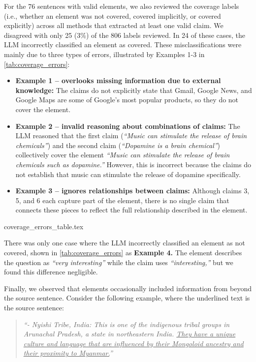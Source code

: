 For the 76 sentences with valid elements, we also reviewed the coverage labels (i.e., whether an element was not covered, covered implicitly, or covered explicitly) across all methods that extracted at least one valid claim. We disagreed with only 25 (3\%) of the 806 labels reviewed. In 24 of these cases, the LLM incorrectly classified an element as covered. These misclassifications were mainly due to three types of errors, illustrated by Examples 1-3 in \autoref{tab:coverage_errors}:
\begin{itemize}
    \item \textbf{Example 1 – overlooks missing information due to external knowledge:} The claims do not explicitly state that Gmail, Google News, and Google Maps are some of Google’s most popular products, so they do not cover the element. 
    \item \textbf{Example 2 – invalid reasoning about combinations of claims:} The LLM reasoned that the first claim (\textit{``Music can stimulate the release of brain chemicals''}) and the second claim (\textit{``Dopamine is a brain chemical''}) collectively cover the element \textit{``Music can stimulate the release of brain chemicals such as dopamine.''} However, this is incorrect because the claims do not establish that music can stimulate the release of dopamine specifically.
    \item \textbf{Example 3 – ignores relationships between claims:} Although claims 3, 5, and 6 each capture part of the element, there is no single claim that connects these pieces to reflect the full relationship described in the element.
\end{itemize}

{coverage_errors_table.tex}

There was only one case where the LLM incorrectly classified an element as not covered, shown in \autoref{tab:coverage_errors} as \textbf{Example 4.} The element describes the question as \textit{``very interesting''} while the claim uses \textit{``interesting,''} but we found this difference negligible. 

Finally, we observed that elements occasionally included information from beyond the source sentence. Consider the following example, where the underlined text is the source sentence:
\begin{quote}
\textit{``- Nyishi Tribe, India: This is one of the indigenous tribal groups in Arunachal Pradesh, a state in northeastern India. \ul{They have a unique culture and language that are influenced by their Mongoloid ancestry and their proximity to Myanmar.}''}
\end{quote}

